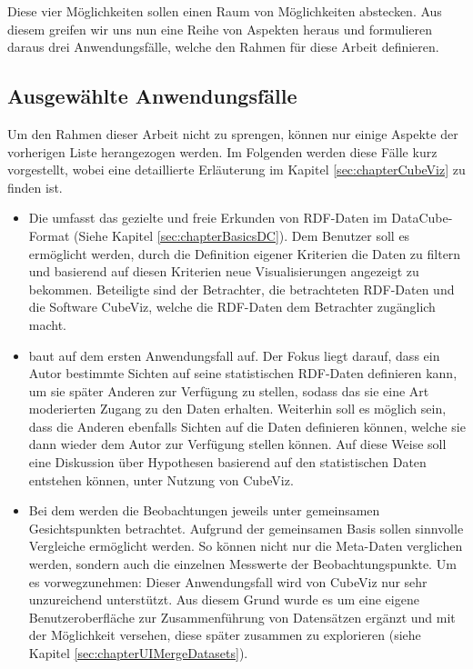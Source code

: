 \documentclass[11pt]{article}
\newcommand{\com}[1]{\marginpar{\em {\small{#1}}}} %
\begin{document}
\noindent
Diese vier Möglichkeiten sollen einen Raum von Möglichkeiten abstecken. Aus diesem greifen wir uns nun eine Reihe von Aspekten heraus und formulieren daraus drei Anwendungsfälle, welche den Rahmen für diese Arbeit definieren. 

%
%
\subsection{Ausgewählte Anwendungsfälle}
\label{sec:chapterUseCaseList}

Um den Rahmen dieser Arbeit nicht zu sprengen, können nur einige Aspekte der vorherigen Liste herangezogen werden. Im Folgenden werden diese Fälle kurz vorgestellt, wobei eine detaillierte Erläuterung im Kapitel \ref{sec:chapterCubeViz}\com{Kapitel \ref{sec:chapterCubeViz} \\ S. \pageref{sec:chapterCubeViz}} zu finden ist.

\begin{itemize}
    \item Die \textit{} umfasst das gezielte und freie Erkunden von RDF-Daten im DataCube-Format (Siehe Kapitel \ref{sec:chapterBasicsDC}).\com{Kapitel \ref{sec:chapterBasicsDC} \\ S. \pageref{sec:chapterBasicsDC}} Dem Benutzer soll es ermöglicht werden, durch die Definition eigener Kriterien die Daten zu filtern und basierend auf diesen Kriterien neue Visualisierungen angezeigt zu bekommen. Beteiligte sind der Betrachter, die betrachteten RDF-Daten und die Software CubeViz, welche die RDF-Daten dem Betrachter zugänglich macht.
    
    \item \textit{} baut auf dem ersten Anwendungsfall auf. Der Fokus liegt darauf, dass ein Autor bestimmte Sichten auf seine statistischen RDF-Daten definieren kann, um sie später Anderen zur Verfügung zu stellen, sodass das sie eine Art moderierten Zugang zu den Daten erhalten. Weiterhin soll es möglich sein, dass die Anderen ebenfalls Sichten auf die Daten definieren können, welche sie dann wieder dem Autor zur Verfügung stellen können. Auf diese Weise soll eine Diskussion über Hypothesen basierend auf den statistischen Daten entstehen können, unter Nutzung von CubeViz.
    
    \item Bei dem \textit{} werden die Beobachtungen jeweils unter gemeinsamen Gesichtspunkten betrachtet. Aufgrund der gemeinsamen Basis sollen sinnvolle Vergleiche ermöglicht werden. So können nicht nur die Meta-Daten verglichen werden, sondern auch die einzelnen Messwerte der Beobachtungspunkte. Um es vorwegzunehmen: Dieser Anwendungsfall wird von CubeViz nur sehr unzureichend unterstützt. Aus diesem Grund wurde es um eine eigene Benutzeroberfläche zur Zusammenführung von Datensätzen ergänzt und mit der Möglichkeit versehen, diese später zusammen zu explorieren\com{Kapitel \ref{sec:chapterUIMergeDatasets} \\ S. \pageref{sec:chapterUIMergeDatasets}} (siehe Kapitel \ref{sec:chapterUIMergeDatasets}). 
    
\end{itemize}
\end{document}
